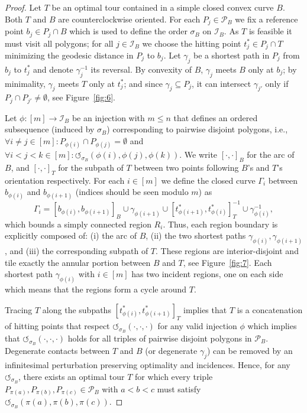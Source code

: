 \documentclass[11pt,a4paper]{article}
\theoremstyle{plain}
\begin{document}
\begin{proof}
Let $T$ be an optimal tour contained in a simple closed convex curve $B$. Both $T$ and $B$ are counterclockwise oriented. For each $P_j \in \mathcal{P}_B$ we fix a reference point $b_j \in P_j \cap B$ which is used to define the order $\sigma_B$ on $\mathcal{I}_B$. As $T$ is feasible it must visit all polygons; for all $j \in \mathcal{I}_B$ we choose the hitting point $t_j^* \in P_j \cap T$ minimizing the geodesic distance in $P_j$ to $b_j$. Let $\gamma_j$ be a shortest path in $P_j$ from $b_j$ to $t_j^*$ and denote $\gamma_j^{-1}$ its reversal. By convexity of $B$, $\gamma_j$ meets $B$ only at $b_j$; by minimality, $\gamma_j$ meets $T$ only at $t_j^*$; and since $\gamma_j \subseteq P_j$, it can intersect $\gamma_{j'}$ only if $P_j \cap P_{j'} \neq \emptyset$, see Figure~\ref{fig:6}.

Let $\phi : [m] \to \mathcal{I}_B$ be an injection with $m \leq n$ that defines an ordered subsequence (induced by $\sigma_B$) corresponding to pairwise disjoint polygons, i.e., $\forall i \neq j \in [m] : P_{\phi(i)} \cap P_{\phi(j)} = \emptyset$ and $\forall i < j < k \in [m] : \circlearrowleft_{\sigma_B}(\phi(i), \phi(j), \phi(k))$. We write $[\cdot,\cdot]_B$ for the arc of $B$, and $[\cdot,\cdot]_T$ for the subpath of $T$ between two points following $B$'s and $T$'s orientation respectively. For each $i \in [m]$ we define the closed curve $\Gamma_i$ between $b_{\phi(i)}$ and $b_{\phi(i+1)}$ (indices should be seen modulo $m$) as
\[
\Gamma_i = [b_{\phi(i)}, b_{\phi(i+1)}]_B \cup \gamma_{\phi(i+1)} \cup [t^*_{\phi(i+1)}, t^*_{\phi(i)}]_T^{-1} \cup \gamma_{\phi(i)}^{-1},
\]
which bounds a simply connected region $R_i$. Thus, each region boundary is explicitly composed of: (i) the arc of $B$, (ii) the two shortest paths $\gamma_{\phi(i)}, \gamma_{\phi(i+1)}$, and (iii) the corresponding subpath of $T$. These regions are interior-disjoint and tile exactly the annular portion between $B$ and $T$, see Figure~\ref{fig:7}. Each shortest path $\gamma_{\phi(i)}$ with $i \in [m]$ has two incident regions, one on each side which means that the regions form a cycle around $T$.

Tracing $T$ along the subpaths $[t^*_{\phi(i)}, t^*_{\phi(i+1)}]_T$ implies that $T$ is a concatenation of hitting points that respect $\circlearrowleft_{\sigma_B}(\cdot,\cdot,\cdot)$ for any valid injection $\phi$ which implies that $\circlearrowleft_{\sigma_B}(\cdot,\cdot,\cdot)$ holds for all triples of pairwise disjoint polygons in $\mathcal{P}_B$. Degenerate contacts between $T$ and $B$ (or degenerate $\gamma_j$) can be removed by an infinitesimal perturbation preserving optimality and incidences. Hence, for any $\circlearrowleft_{\sigma_B}$, there exists an optimal tour $T$ for which every triple $P_{\pi(a)}, P_{\pi(b)}, P_{\pi(c)} \in \mathcal{P}_B$ with $a < b < c$ must satisfy $\circlearrowleft_{\sigma_B}(\pi(a), \pi(b), \pi(c))$.
\end{proof}
\end{document}
